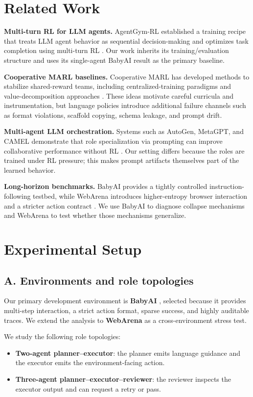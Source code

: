 \documentclass{ieeeaccess}
\begin{document}
\section{Related Work}
\textbf{Multi-turn RL for LLM agents.} AgentGym-RL established a training recipe that treats LLM agent behavior as sequential decision-making and optimizes task completion using multi-turn RL \cite{agentgymrl2025}. Our work inherits its training/evaluation structure and uses its single-agent BabyAI result as the primary baseline.

\textbf{Cooperative MARL baselines.} Cooperative MARL has developed methods to stabilize shared-reward teams, including centralized-training paradigms and value-decomposition approaches \cite{maddpg2017,qmix2018,mappo2021}. These ideas motivate careful curricula and instrumentation, but language policies introduce additional failure channels such as format violations, scaffold copying, schema leakage, and prompt drift.

\textbf{Multi-agent LLM orchestration.} Systems such as AutoGen, MetaGPT, and CAMEL demonstrate that role specialization via prompting can improve collaborative performance without RL \cite{autogen2023,metagpt2023,camel2023}. Our setting differs because the roles are trained under RL pressure; this makes prompt artifacts themselves part of the learned behavior.

\textbf{Long-horizon benchmarks.} BabyAI provides a tightly controlled instruction-following testbed, while WebArena introduces higher-entropy browser interaction and a stricter action contract \cite{babyai2018,webarena2023,scienceworld2022,agentbench2023}. We use BabyAI to diagnose collapse mechanisms and WebArena to test whether those mechanisms generalize.

\section{Experimental Setup}
\subsection{A. Environments and role topologies}
Our primary development environment is \textbf{BabyAI} \cite{babyai2018}, selected because it provides multi-step interaction, a strict action format, sparse success, and highly auditable traces. We extend the analysis to \textbf{WebArena} \cite{webarena2023} as a cross-environment stress test.

We study the following role topologies:
\begin{itemize}
\item \textbf{Two-agent planner--executor}: the planner emits language guidance and the executor emits the environment-facing action.
\item \textbf{Three-agent planner--executor--reviewer}: the reviewer inspects the executor output and can request a retry or pass.
\end{itemize}
\end{document}
